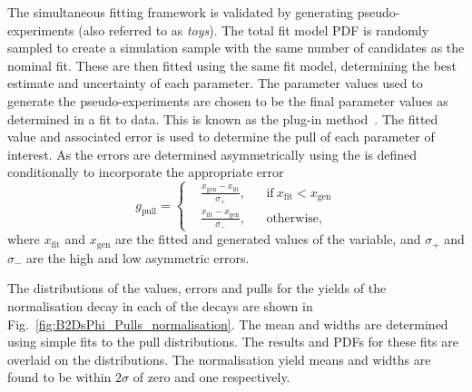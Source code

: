 The simultaneous fitting framework is validated by generating pseudo-experiments (also referred to as \emph{toys}). The total fit model PDF is randomly sampled to create a simulation sample with the same number of candidates as the nominal fit. These are then fitted using the same fit model, determining the best estimate and uncertainty of each parameter. The parameter values used to generate the pseudo-experiments are chosen to be the final parameter values as determined in a fit to data. This is known as the plug-in method~\cite{plugin}.
The fitted value and associated error is used to determine the pull of each parameter of interest. As the errors are determined asymmetrically using \minos the is defined conditionally to incorporate the appropriate error 
\begin{equation}
  g_{\text{pull}} = \left \{
  \begin{aligned}
    &\frac{x_{\text{gen}} - x_{\text{fit}} }{\sigma_{+}}, && \text{if}\ x_{\text{fit}} < x_{\text{gen}}\\
    &\frac{x_{\text{fit}} - x_{\text{gen}} }{\sigma_{-}}, && \text{otherwise},
  \end{aligned} \right.
\end{equation} 
where $x_{\text{fit}}$ and $x_{\text{gen}}$ are the fitted and generated values of the variable, and $\sigma_{+}$ and $\sigma_{-}$ are the high and low asymmetric errors.

The distributions of the values, errors and pulls for the yields of the normalisation decay in each of the \Dsp decays are shown in Fig.~\ref{fig:B2DsPhi_Pulls_normalisation}. The mean and widths are determined using simple fits to the pull distributions. The results and PDFs for these fits are overlaid on the distributions. The normalisation yield means and widths are found to be within $2\sigma$ of zero and one respectively.


